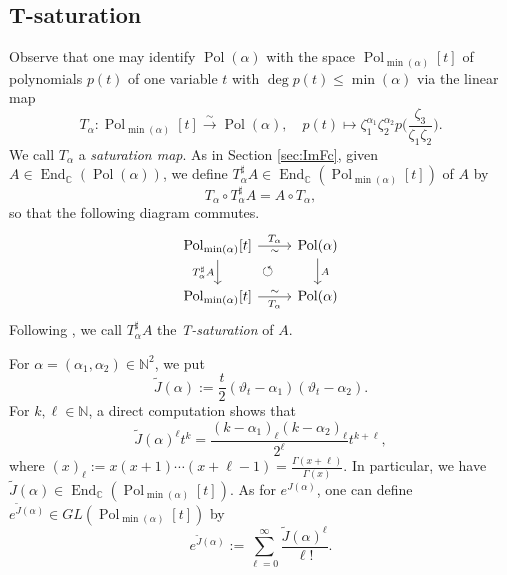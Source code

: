 \documentclass[a4paper,11pt,reqno]{amsart}
\newcommand{\CC}{\mathbb{C}}
\newcommand{\NN}{\mathbb{N}}
\newcommand{\0}{{\bf 0}}
\newcommand{\N}{\mathbb{N}}
\newcommand{\C}{\mathbb{C}}
\newcommand{\1}{{\bf 1}}
\DeclareMathOperator{\End}{End}
\DeclareMathOperator{\Pol}{Pol}
\newcommand{\wJ}{\widetilde{J}}
\theoremstyle{plain}
\theoremstyle{definition}
\numberwithin{equation}{section}
\theoremstyle{definition}
\begin{document}
\subsection{T-saturation}
\label{sec:T-saturation}

Observe that one may identify $\Pol(\alpha)$ with the space $\Pol_{\min(\alpha)}[t]$ of polynomials $p(t)$ of one variable $t$ with $\deg p(t) \leq \min(\alpha)$ via the linear map
\begin{equation}\label{eqn:Tsat}
T_\alpha\colon
\Pol_{\min(\alpha)}[t]\xrightarrow{\sim}\Pol(\alpha),\quad 
p(t)\mapsto \zeta_1^{\alpha_1}\zeta_2^{\alpha_2}p\Big(\frac{\zeta_3}{\zeta_1\zeta_2}\Big).
\end{equation}
We call $T_{\alpha}$ a \emph{saturation map}.
As in Section \ref{sec:ImFc}, 
given $A\in \End_\C(\Pol(\alpha))$, we define 
$T_\alpha^\sharp A\in \End_\C(\Pol_{\min(\alpha)}[t])$
of $A$ by
\begin{equation}\label{eqnTsharp}
T_\alpha\circ T_\alpha^\sharp A=A\circ T_\alpha, 
\end{equation}
so that the following diagram commutes.
\[\begin{tikzcd}
	{\Pol_{\min(\alpha)}[t]} & {\Pol(\alpha)}
	\arrow[dl, pos=0.5, phantom, "\circlearrowleft"] \\
	{\Pol_{\min(\alpha)}[t]} & {\Pol(\alpha)}
	\arrow["{T_\alpha}", "\sim"', from=1-1, to=1-2]
	\arrow[ "{T_\alpha^\sharp A}"', from=1-1, to=2-1]
	\arrow["A",  from=1-2, to=2-2]
	\arrow["\sim", "{T_\alpha}"', from=2-1, to=2-2]
\end{tikzcd}\]
Following \cite[Sec.\ 3.2]{KoPe16b}, 
we call $T_\alpha^\sharp A$ the \emph{T-saturation} of $A$.

For $\alpha=(\alpha_1,\alpha_2) \in \NN^2$, we put
\begin{equation}\label{eqn:Da}
\wJ(\alpha):=\frac{t}{2}(\vartheta_t-\alpha_1)(\vartheta_t-\alpha_2).
\end{equation}
For $k,\ell\in \N$, a direct computation shows that 
\begin{equation}\label{eqn:D1}
\wJ(\alpha)^\ell t^k 
=\frac{(k-\alpha_1)_\ell(k-\alpha_2)_\ell}{2^\ell}
t^{k+\ell},
\end{equation}
where $(x)_\ell:=x(x+1) \cdots (x+\ell-1) = \frac{\Gamma(x+\ell)}{\Gamma(x)}$.
In particular, we have 
$\wJ(\alpha) \in \End_\CC(\Pol_{\min(\alpha)}[t])$.
As for $e^{J(\alpha)}$, one can define 
$e^{\wJ(\alpha)} \in GL(\Pol_{\min(\alpha)}[t])$ by
\begin{equation*}
e^{\wJ(\alpha)}
:=\sum_{\ell=0}^\infty \frac{\wJ(\alpha)^\ell}{\ell!}.
\end{equation*}
\end{document}
